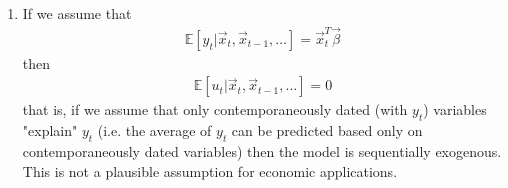 \documentclass[a4paper]{article}
\newcommand{\expect}{\mathbb{E}}
\begin{document}
\begin{enumerate}
	\item If we assume that 
	\begin{align*}
	\expect[y_t|\vec{x}_t, \vec{x}_{t-1}, \dots] = \vec{x}_t^T\vec{\beta}
	\end{align*}
	then
	\begin{align*}
	\expect[u_t|\vec{x}_t, \vec{x}_{t-1}, \dots] = 0
	\end{align*}
	that is, if we assume that only contemporaneously dated (with $y_t$) variables "explain" $y_t$ (i.e. the average of $y_t$ can be predicted based only on contemporaneously dated variables) then the model is sequentially exogenous. This is not a plausible assumption for economic applications.
\end{enumerate}
\end{document}
